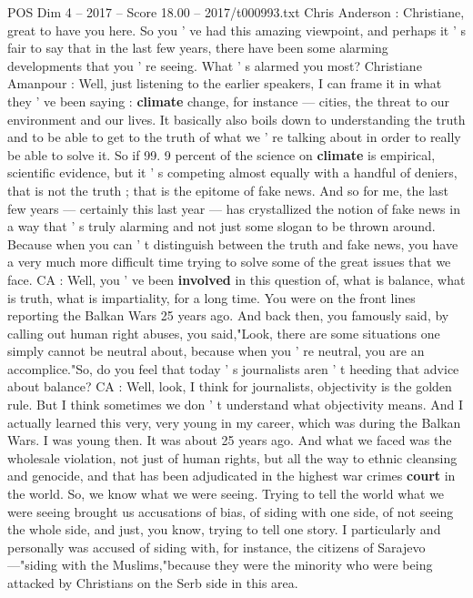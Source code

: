\begin{textsample}{POS Dim 4 – 2017 – Score 18.00 – 2017/t000993.txt}  \label{ex:f4_pos_045}
Chris Anderson : Christiane, great to have you here.
So you ' ve had this amazing viewpoint, and perhaps it ' s fair to say that in the last few years, there have been some alarming developments that you ' re seeing.
What ' s alarmed you most?
Christiane Amanpour : Well, just listening to the earlier speakers, I can frame it in what they ' ve been saying : \textbf{climate} change, for instance — cities, the threat to our environment and our lives.
It basically also boils down to understanding the truth and to be able to get to the truth of what we ' re talking about in order to really be able to solve it.
So if 99. 9 percent of the science on \textbf{climate} is empirical, scientific evidence, but it ' s competing almost equally with a handful of deniers, that is not the truth ; that is the epitome of fake news.
And so for me, the last few years — certainly this last year — has crystallized the notion of fake news in a way that ' s truly alarming and not just some slogan to be thrown around.
Because when you can ' t distinguish between the truth and fake news, you have a very much more difficult time trying to solve some of the great issues that we face.
CA : Well, you ' ve been \textbf{involved} in this question of, what is balance, what is truth, what is impartiality, for a long time.
You were on the front lines reporting the Balkan Wars 25 years ago.
And back then, you famously said, by calling out human right abuses, you said,"Look, there are some situations one simply cannot be neutral about, because when you ' re neutral, you are an accomplice."So, do you feel that today ' s journalists aren ' t heeding that advice about balance?
CA : Well, look, I think for journalists, objectivity is the golden rule.
But I think sometimes we don ' t understand what objectivity means.
And I actually learned this very, very young in my career, which was during the Balkan Wars.
I was young then.
It was about 25 years ago.
And what we faced was the wholesale violation, not just of human rights, but all the way to ethnic cleansing and genocide, and that has been adjudicated in the highest war crimes \textbf{court} in the world.
So, we know what we were seeing.
Trying to tell the world what we were seeing brought us accusations of bias, of siding with one side, of not seeing the whole side, and just, you know, trying to tell one story.
I particularly and personally was accused of siding with, for instance, the citizens of Sarajevo —"siding with the Muslims,"because they were the minority who were being attacked by Christians on the Serb side in this area.

\end{textsample}
